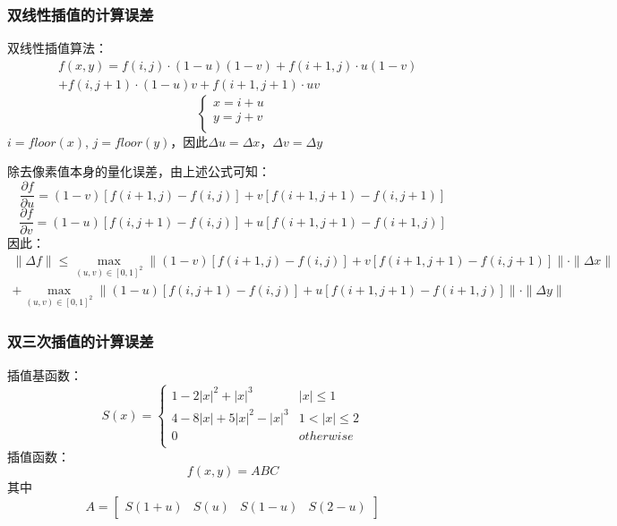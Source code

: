\documentclass{article}
\begin{document}
\subsubsection{双线性插值的计算误差}
双线性插值算法：
\begin{equation}
	\begin{aligned}
	& f(x,y) = f(i,j)\cdot (1-u)(1-v) + f(i+1,j)\cdot u(1-v) \\
	& + f(i,j+1)\cdot (1-u)v + f(i+1,j+1)\cdot uv
	\end{aligned}
\end{equation}
\begin{equation}
	\left\{
		\begin{aligned}
			x = i + u\\
			y = j + v\\
		\end{aligned}
	\right.
\end{equation}
$i = floor(x)$, $j = floor(y)$，因此$\Delta u = \Delta x$，$\Delta v = \Delta y$

除去像素值本身的量化误差，由上述公式可知：
$$\frac{\partial f}{\partial u} = (1-v)[f(i+1,j)-f(i,j)] + v[f(i+1,j+1)-f(i,j+1)]$$
$$\frac{\partial f}{\partial v} = (1-u)[f(i,j+1)-f(i,j)] + u[f(i+1,j+1)-f(i+1,j)]$$
因此：
\begin{equation}
	\begin{aligned}
		\| \Delta f\| \leqslant \max_{(u,v)\in [0,1]^{2}}{\|(1-v)[f(i+1,j)-f(i,j)] + v[f(i+1,j+1)-f(i,j+1)]\|}\cdot \|\Delta x\| \\
		+ \max_{(u,v)\in [0,1]^{2}}{\|(1-u)[f(i,j+1)-f(i,j)] + u[f(i+1,j+1)-f(i+1,j)]\|}\cdot \|\Delta y\|
	\end{aligned}
\end{equation}

\subsubsection{双三次插值的计算误差}
\noindent 插值基函数：
\begin{equation}
	S(x)=
	\begin{cases}
		1 - 2|x|^2 + |x|^3 & |x| \leqslant 1\\
		4 - 8|x| + 5|x|^2 - |x|^3 & 1 < |x| \leqslant 2\\
		0 & otherwise\\
	\end{cases}
\end{equation}
插值函数：
$$f(x,y) = ABC$$
其中
\begin{equation}
	A=
	\begin{bmatrix} 
		S(1+u) & S(u) & S(1-u) & S(2-u)
	\end{bmatrix}
\end{equation}
\end{document}
